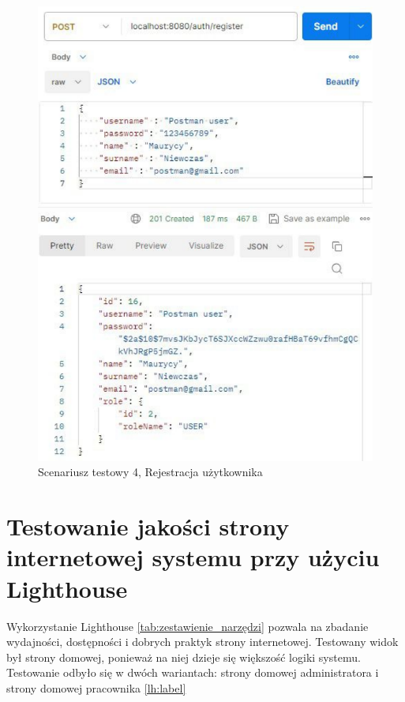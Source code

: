\begin{figure}[h]
		\centering
    \includegraphics[width=0.7\linewidth]{rys06/postmanTest/register.pdf}
    \caption{Scenariusz testowy 4, Rejestracja użytkownika}
    \label{registerTest:label}
\end{figure}

\newpage
\section{Testowanie jakości strony internetowej systemu przy użyciu Lighthouse}

Wykorzystanie Lighthouse \ref{tab:zestawienie_narzędzi} pozwala na zbadanie wydajności, dostępności i dobrych praktyk strony internetowej. Testowany widok był strony domowej, ponieważ na niej dzieje się większość logiki systemu. Testowanie odbyło się w dwóch wariantach: strony domowej administratora i strony domowej pracownika \ref{lh:label}

